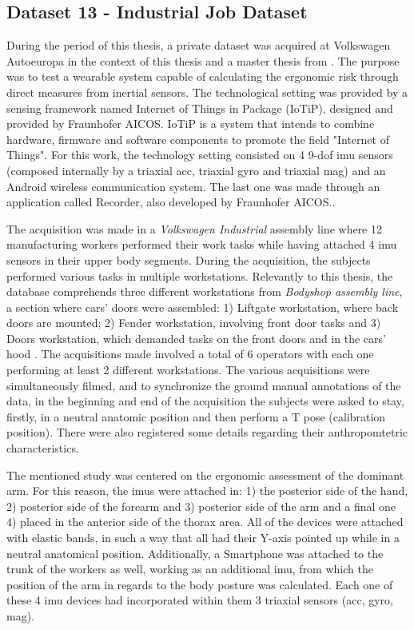 \subsection{Dataset 13 - Industrial Job Dataset}
\label{sec:industry}

During the period of this thesis, a private dataset was acquired at Volkswagen Autoeuropa in the context of this thesis and a master thesis from \cite{santos2019}. The purpose was to test a wearable system capable of calculating the ergonomic risk through direct measures from inertial sensors. The technological setting was provided by a sensing framework named Internet of Things in Package (IoTiP), designed and provided by Fraunhofer AICOS. IoTiP is a system that intends to combine hardware, firmware and software components to promote the field "Internet of Things"\cite{FraunhoferAICOS}. For this work, the technology setting consisted on 4 9-\gls{dof} \gls{imu} sensors (composed internally by a triaxial \gls{acc}, triaxial \gls{gyro} and triaxial \gls{mag}) and an Android wireless communication system. The last one was made through an application called Recorder, also developed by Fraunhofer AICOS.\cite{santos2019}.
\par
The acquisition was made in a \textit{Volkswagen Industrial} assembly line where 12 manufacturing workers performed their work tasks while having attached 4 \gls{imu} sensors in their upper body segments. During the acquisition, the subjects performed various tasks in multiple workstations. Relevantly to this thesis, the database comprehends three different workstations from \textit{Bodyshop assembly line}, a section where cars' doors were assembled: 1) Liftgate workstation, where back doors are mounted; 2) Fender workstation, involving front door tasks and 3) Doors workstation, which demanded tasks on the front doors and in the cars' hood \cite{santos2019}. The acquisitions made involved a total of 6 operators with each one performing at least 2 different workstations. The various acquisitions were simultaneously filmed, and to synchronize the ground manual annotations of the data, in the beginning and end of the acquisition the subjects were asked to stay, firstly, in a neutral anatomic position and then perform a T pose (calibration position). There were also registered some details regarding their anthropomtetric characteristics.
\par
The mentioned study was centered on the ergonomic assessment of the dominant arm. For this reason, the \gls{imu}s  were attached in: 1) the posterior side of the hand, 2) posterior side of the forearm and 3) posterior side of the arm and a final one 4) placed in the anterior side of the thorax area. All of the devices were attached with elastic bands, in such a way that all had their Y-axis pointed up while in a neutral anatomical position. Additionally, a Smartphone was attached to the trunk of the workers as well, working as an additional \gls{imu}, from which the position of the arm in regards to the body posture was calculated. Each one of these 4 \gls{imu} devices had incorporated within them 3 triaxial sensors (\gls{acc}, \gls{gyro}, \gls{mag}).\\
